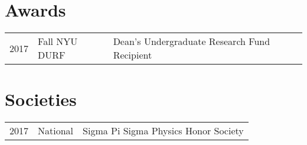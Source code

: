 \documentclass[]{deedy-resume-openfont}
\begin{document}
\begin{minipage}[t]{0.66\textwidth}

\section{Awards} 
\begin{tabular}{rll}
2017	     & Fall NYU DURF  & Dean's Undergraduate Research Fund Recipient\\
\end{tabular}
\sectionsep


\section{Societies} 

\begin{tabular}{rll}
2017 	& National    & Sigma Pi Sigma Physics Honor Society\\
\end{tabular}
\sectionsep

\end{minipage} 
\end{document}
